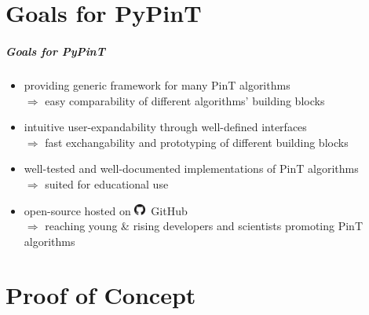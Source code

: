 \documentclass[%
  english,
  hyperref={pdfpagelabels=false},
  aspectratio=1610]{beamer}
\begin{document}
\part{Goals for PyPinT}
\makepart

\begin{frame}
  \frametitle{Goals for PyPinT}
  
  \begin{itemize}
    \item<1-> providing generic framework for many PinT algorithms\\
      {\color{fzjblue50}$\Rightarrow$ easy comparability of different algorithms' building blocks\\[1.5em]}
    \item<2-> intuitive user-expandability through well-defined interfaces\\
      {\color{fzjblue50}$\Rightarrow$ fast exchangability and prototyping of different building blocks\\[1.5em]}
    \item<3-> well-tested and well-documented implementations of PinT algorithms\\
      {\color{fzjblue50}$\Rightarrow$ suited for educational use\\[1.5em]}
    \item<4-> open-source hosted on \includegraphics[height=1em]{src/GitHub-Mark-32px.png}~GitHub\\
      {\color{fzjblue50}$\Rightarrow$ reaching young \& rising developers and scientists promoting PinT algorithms\\[1.5em]}
  \end{itemize}
\end{frame}


\part{Proof of Concept}
\makepart
\end{document}

